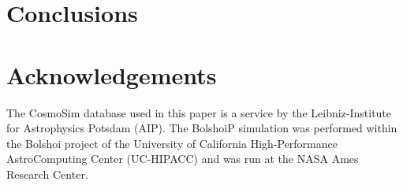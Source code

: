 \documentclass{emulateapj}
\begin{document}
\section{Conclusions}
\label{sec:conclusions}


\section*{Acknowledgements}

The CosmoSim database used in this paper is a service by the
Leibniz-Institute for Astrophysics Potsdam (AIP). The  BolshoiP
simulation was performed within the Bolshoi project of the University
of California High-Performance  AstroComputing Center (UC-HIPACC) and
was run at the NASA Ames Research Center. 



 
\end{document}
